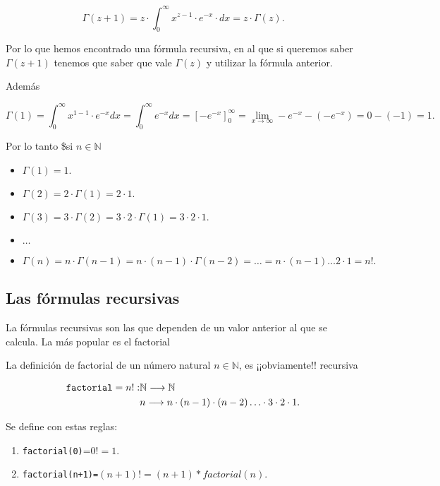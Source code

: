 \documentclass[
]{article}
\providecommand{\tightlist}{%
  \setlength{\itemsep}{0pt}\setlength{\parskip}{0pt}}
\begin{document}
\[\Gamma(z+1)= 
z\cdot \int_0^{\infty} x^{z-1} \cdot e^{-x}\cdot  dx=z\cdot \Gamma(z).
\]

Por lo que hemos encontrado una fórmula recursiva, en al que si queremos
saber \(\Gamma(z+1)\) tenemos que saber que vale \(\Gamma(z)\) y
utilizar la fórmula anterior.

Además

\[\Gamma(1)=\int_0^{\infty} x^{1-1} \cdot e^{-x}  dx=\int_0^{\infty}  e^{-x}  dx=
\left[-e^{-x}\right]_{0}^{\infty}=\lim_{x\to \infty} -e^{-x}- \left( -e^{-x}\right)=0-(-1)=1.\]

Por lo tanto \$si \(n\in\mathbb{N}\)

\begin{itemize}
\tightlist
\item
  \(\Gamma(1)=1.\)
\item
  \(\Gamma(2)=2 \cdot \Gamma(1)=2\cdot 1.\)
\item
  \(\Gamma(3)= 3 \cdot\Gamma(2)= 3 \cdot 2 \cdot \Gamma(1)= 3\cdot 2 \cdot 1.\)
\item
  \(\ldots\)
\item
  \(\Gamma(n)= n \cdot\Gamma(n-1)= n \cdot (n-1) \cdot \Gamma(n-2)=\ldots=n\cdot (n-1)\ldots 2\cdot 1=n!.\)
\end{itemize}

\subsection{Las fórmulas recursivas}\label{las-fuxf3rmulas-recursivas}

La fórmulas recursivas son las que dependen de un valor anterior al que
se calcula. La más popular es el factorial

La definición de factorial de un número natural \(n\in\mathbb{N}\), es
¡¡obviamente!! recursiva

\[
\begin{aligned}
\verb+factorial+ = n!: & \mathbb{N} \longrightarrow  \mathbb{N}\\
& n \longrightarrow  n\cdot (n-1)\cdot (n-2) \ldots \cdot 3\cdot 2\cdot 1.
\end{aligned}
\]

Se define con estas reglas:

\begin{enumerate}
\def\labelenumi{\arabic{enumi}.}
\tightlist
\item
  \texttt{factorial(0)}=\(0!=1\).
\item
  \texttt{factorial(n+1)=}\((n+1)!=(n+1)*factorial(n).\)
\end{enumerate}
\end{document}
